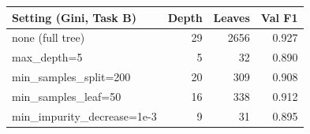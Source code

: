 \begin{tabular}{@{}lrrr@{}}
\toprule
Setting (Gini, Task B) & Depth & Leaves & Val F1 \\
\midrule
none (full tree) & 29 & 2656 & 0.927 \\
max\_depth=5 & 5 & 32 & 0.890 \\
min\_samples\_split=200 & 20 & 309 & 0.908 \\
min\_samples\_leaf=50 & 16 & 338 & 0.912 \\
min\_impurity\_decrease=1e-3 & 9 & 31 & 0.895 \\
\bottomrule
\end{tabular}

